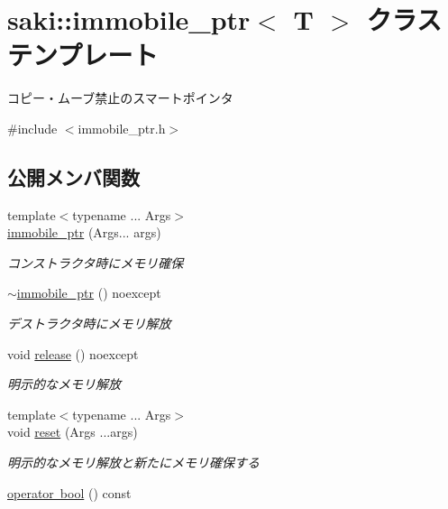 \hypertarget{classsaki_1_1immobile__ptr}{}\section{saki\+:\+:immobile\+\_\+ptr$<$ T $>$ クラステンプレート}
\label{classsaki_1_1immobile__ptr}


コピー・ムーブ禁止のスマートポインタ  




{\ttfamily \#include $<$immobile\+\_\+ptr.\+h$>$}

\subsection*{公開メンバ関数}
\begin{DoxyCompactItemize}
\item 
{\footnotesize template$<$typename ... Args$>$ }\\\mbox{\hyperlink{classsaki_1_1immobile__ptr_aa64c721ab505396e3b7b75bb6916b562}{immobile\+\_\+ptr}} (Args... args)
\begin{DoxyCompactList}\small\item\em コンストラクタ時にメモリ確保 \end{DoxyCompactList}\item 
\mbox{\hyperlink{classsaki_1_1immobile__ptr_a7cb3ccfa2a366adfe164a0ba6c0f86d6}{$\sim$immobile\+\_\+ptr}} () noexcept
\begin{DoxyCompactList}\small\item\em デストラクタ時にメモリ解放 \end{DoxyCompactList}\item 
void \mbox{\hyperlink{classsaki_1_1immobile__ptr_a889ef4da216534edcf859d9da97e5955}{release}} () noexcept
\begin{DoxyCompactList}\small\item\em 明示的なメモリ解放 \end{DoxyCompactList}\item 
{\footnotesize template$<$typename ... Args$>$ }\\void \mbox{\hyperlink{classsaki_1_1immobile__ptr_ad2e77d17881c8e10ba918f80fd9ad1cd}{reset}} (Args ...args)
\begin{DoxyCompactList}\small\item\em 明示的なメモリ解放と新たにメモリ確保する \end{DoxyCompactList}\item 
\mbox{\hyperlink{classsaki_1_1immobile__ptr_a50dadf5f0d26f517543df590ede03acd}{operator bool}} () const

\end{DoxyCompactItemize}
